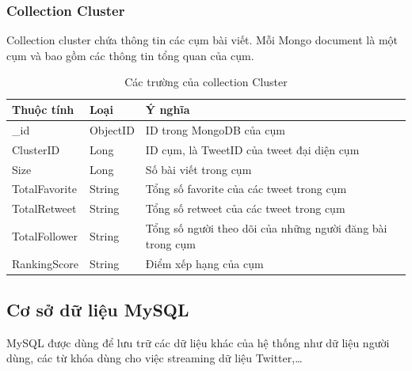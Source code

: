 		\subsubsection{Collection Cluster}
		Collection cluster chứa thông tin các cụm bài viết. Mỗi Mongo document là một cụm và bao gồm các thông tin tổng quan của cụm.
		\begin{table}[H]
			\setlength\extrarowheight{3pt}
			\begin{tabular}{|l|l|p{9cm}|}
				\hline
				\textbf{Thuộc tính}     & \textbf{Loại} & \textbf{Ý nghĩa} \\\hline
				\_id           & ObjectID       &  ID trong MongoDB của cụm\\\hline
				ClusterID      & Long           &  ID cụm, là TweetID của tweet đại diện cụm\\\hline
				Size	       & Long           &  Số bài viết trong cụm\\\hline
				TotalFavorite	& String         & Tổng số favorite của các tweet trong cụm\\\hline
				TotalRetweet	& String         & Tổng số retweet của các tweet trong cụm\\\hline
				TotalFollower	& String         & Tổng số người theo dõi của những người đăng bài trong cụm\\\hline
				RankingScore	& String         & Điểm xếp hạng của cụm\\\hline
				
			\end{tabular}%
			\caption{Các trường của collection Cluster}
			\label{tab:table_3_3}%
		\end{table}%

	\subsection{Cơ sở dữ liệu MySQL}
	MySQL được dùng để lưu trữ các dữ liệu khác của hệ thống như dữ liệu người dùng, các từ khóa dùng cho việc streaming dữ liệu Twitter,…
